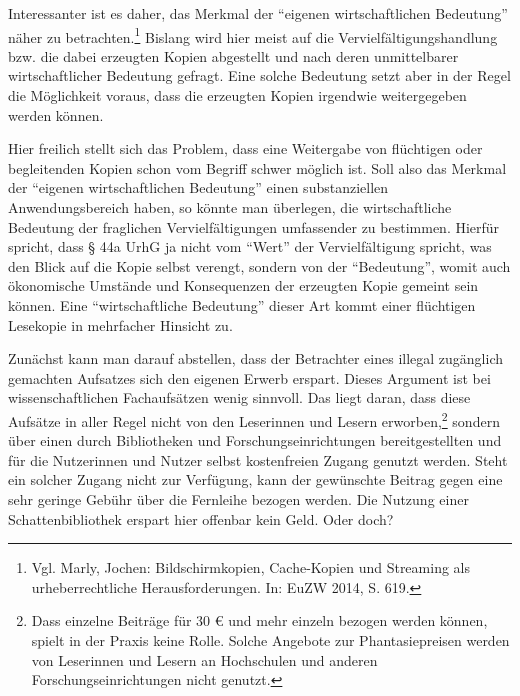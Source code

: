 \documentclass[a4paper,
fontsize=11pt,
oneside,
numbers=noperiodatend,
parskip=half-,
bibliography=totoc,
final
]{scrartcl}
\begin{document}
Interessanter ist es daher, das Merkmal der \enquote{eigenen
wirtschaftlichen Bedeutung} näher zu betrachten.\footnote{Vgl. Marly,
  Jochen: Bildschirmkopien, Cache-Kopien und Streaming als
  urheberrechtliche Heraus­forderungen. In: EuZW 2014, S. 619.} Bislang
wird hier meist auf die Vervielfältigungshandlung bzw. die dabei
erzeugten Kopien abgestellt und nach deren unmittelbarer
wirtschaftlicher Bedeutung gefragt. Eine solche Bedeutung setzt aber in
der Regel die Möglichkeit voraus, dass die erzeugten Kopien irgendwie
weitergegeben werden können.

Hier freilich stellt sich das Problem, dass eine Weitergabe von
flüchtigen oder begleitenden Kopien schon vom Begriff schwer möglich
ist. Soll also das Merkmal der \enquote{eigenen wirtschaftlichen
Bedeutung} einen substanziellen Anwendungsbereich haben, so könnte man
überlegen, die wirtschaftliche Bedeutung der fraglichen
Vervielfältigungen umfassender zu bestimmen. Hierfür spricht, dass § 44a
UrhG ja nicht vom \enquote{Wert} der Vervielfältigung spricht, was den
Blick auf die Kopie selbst verengt, sondern von der \enquote{Bedeutung},
womit auch ökonomische Umstände und Konsequenzen der erzeugten Kopie
gemeint sein können. Eine \enquote{wirtschaftliche Bedeutung} dieser Art
kommt einer flüchtigen Lesekopie in mehrfacher Hinsicht zu.

Zunächst kann man darauf abstellen, dass der Betrachter eines illegal
zugänglich gemachten Aufsatzes sich den eigenen Erwerb erspart. Dieses
Argument ist bei wissenschaftlichen Fachaufsätzen wenig sinnvoll. Das
liegt daran, dass diese Aufsätze in aller Regel nicht von den Leserinnen
und Lesern erworben,\footnote{Dass einzelne Beiträge für 30 \euro{} und
  mehr einzeln bezogen werden können, spielt in der Praxis keine Rolle.
  Solche Angebote zur Phantasiepreisen werden von Leserinnen und Lesern
  an Hochschulen und anderen Forschungseinrichtungen nicht genutzt.}
sondern über einen durch Bibliotheken und Forschungseinrichtungen
bereitgestellten und für die Nutzerinnen und Nutzer selbst kostenfreien
Zugang genutzt werden. Steht ein solcher Zugang nicht zur Verfügung,
kann der gewünschte Beitrag gegen eine sehr geringe Gebühr über die
Fernleihe bezogen werden. Die Nutzung einer Schattenbibliothek erspart
hier offenbar kein Geld. Oder doch?
\end{document}
